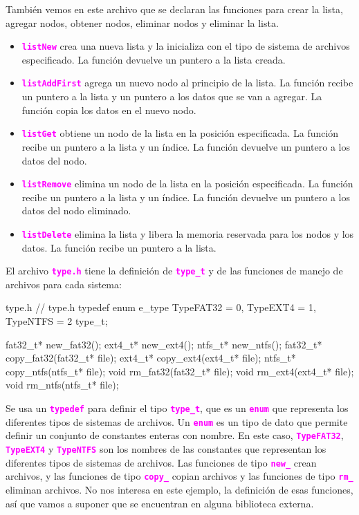 \documentclass[]{scrartcl}
\newcommand{\hl}[1]{\textcolor{magenta}{\textbf{\texttt{#1}}}}
\begin{document}
También vemos en este archivo que se declaran las funciones para crear la lista, agregar nodos, obtener nodos, eliminar nodos y eliminar la lista.
\begin{itemize}
  \item \hl{listNew} crea una nueva lista y la inicializa con el tipo de sistema de archivos especificado. La función devuelve un puntero a la lista creada.
  \item \hl{listAddFirst} agrega un nuevo nodo al principio de la lista. La función recibe un puntero a la lista y un puntero a los datos que se van a agregar. La función copia los datos en el nuevo nodo.
  \item \hl{listGet} obtiene un nodo de la lista en la posición especificada. La función recibe un puntero a la lista y un índice. La función devuelve un puntero a los datos del nodo.
  \item \hl{listRemove} elimina un nodo de la lista en la posición especificada. La función recibe un puntero a la lista y un índice. La función devuelve un puntero a los datos del nodo eliminado.
  \item \hl{listDelete} elimina la lista y libera la memoria reservada para los nodos y los datos. La función recibe un puntero a la lista.
\end{itemize}

El archivo \hl{type.h} tiene la definición de \hl{type\_t} y de las funciones de manejo de archivos para cada sistema:

\begin{cbox}[]{type.h}
  // type.h
  typedef enum e_type {
    TypeFAT32 = 0,
    TypeEXT4 = 1,
    TypeNTFS = 2
  } type_t;

  fat32_t* new_fat32();
  ext4_t* new_ext4();
  ntfs_t* new_ntfs();          
  fat32_t* copy_fat32(fat32_t* file);
  ext4_t* copy_ext4(ext4_t* file);
  ntfs_t* copy_ntfs(ntfs_t* file);
  void rm_fat32(fat32_t* file);
  void rm_ext4(ext4_t* file);
  void rm_ntfs(ntfs_t* file);
\end{cbox}

Se usa un \hl{typedef} para definir el tipo \hl{type\_t}, que es un \hl{enum} que representa los diferentes tipos de sistemas de archivos. Un \hl{enum} es un tipo de dato que permite definir un conjunto de constantes enteras con nombre. En este caso, \hl{TypeFAT32}, \hl{TypeEXT4} y \hl{TypeNTFS} son los nombres de las constantes que representan los diferentes tipos de sistemas de archivos.
Las funciones de tipo \hl{new\_} crean archivos, y las funciones de tipo \hl{copy\_} copian archivos y las funciones de tipo \hl{rm\_} eliminan archivos. No nos interesa en este ejemplo, la definición de esas funciones, así que vamos a suponer que se encuentran en alguna biblioteca externa.
\end{document}
